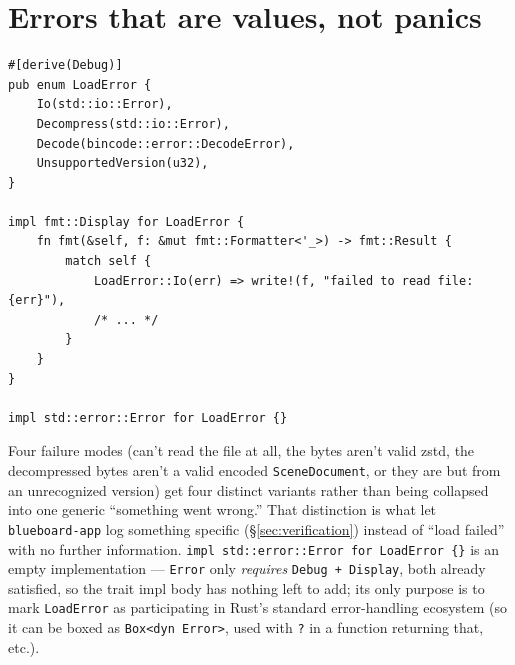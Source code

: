 \documentclass[11pt]{article}
\begin{document}
\section{Errors that are values, not panics}
\label{sec:errors}
\begin{lstlisting}
#[derive(Debug)]
pub enum LoadError {
    Io(std::io::Error),
    Decompress(std::io::Error),
    Decode(bincode::error::DecodeError),
    UnsupportedVersion(u32),
}

impl fmt::Display for LoadError {
    fn fmt(&self, f: &mut fmt::Formatter<'_>) -> fmt::Result {
        match self {
            LoadError::Io(err) => write!(f, "failed to read file: {err}"),
            /* ... */
        }
    }
}

impl std::error::Error for LoadError {}
\end{lstlisting}
Four failure modes (can't read the file at all, the bytes aren't valid zstd, the
decompressed bytes aren't a valid encoded \texttt{SceneDocument}, or they are but from an
unrecognized version) get four distinct variants rather than being collapsed into one
generic ``something went wrong.'' That distinction is what let \texttt{blueboard-app} log
something specific (\S\ref{sec:verification}) instead of ``load failed'' with no further
information. \texttt{impl std::error::Error for LoadError \{\}} is an empty implementation
— \texttt{Error} only \emph{requires} \texttt{Debug + Display}, both already satisfied, so
the trait impl body has nothing left to add; its only purpose is to mark \texttt{LoadError}
as participating in Rust's standard error-handling ecosystem (so it can be boxed as
\texttt{Box<dyn Error>}, used with \texttt{?} in a function returning that, etc.).
\end{document}

